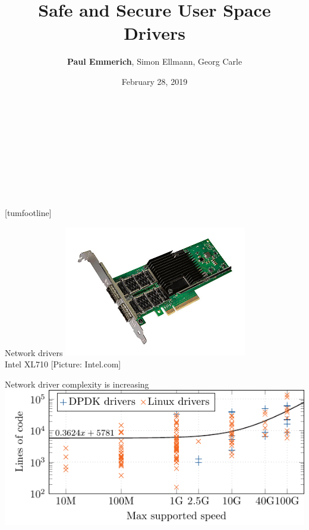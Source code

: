 \documentclass[NET,english,aspectratio=169,notitleframe]{tumbeamer}
\author[Paul Emmerich]{\textbf{Paul Emmerich}, Simon Ellmann, Georg Carle}
\title{Safe and Secure User Space Drivers}
\date{February 28, 2019}
\begin{document}
  \begin{frame}[c,noframenumbering]
  \centering%
  \Large%
  \strut\textcolor{TUMBlue}{\inserttitle}%
  \\[4ex]%
  \normalsize%
\footnotesize  \strut\insertauthor%
  \\[2ex]%
  \footnotesize%
  \insertdate%
  \\[4ex]%
  \ifdefined\departmentname%
    \ifdefined\chairname%
      \chairname\\%
    \fi%
    \departmentname\\%
  \fi%
  \TUMname\\%
\end{frame}
[tumfootline]


\begin{frame}{Network drivers}
\centering\includegraphics[width=0.60\textwidth]{pics/nic3}\\
\vspace{-1em}\tiny{Intel XL710 [Picture: Intel.com]}
\end{frame}

\begin{frame}{Network driver complexity is increasing}
\centering\includegraphics[scale=1.1]{figures/drivers-loc-scatterplot}
\end{frame}
\end{document}
